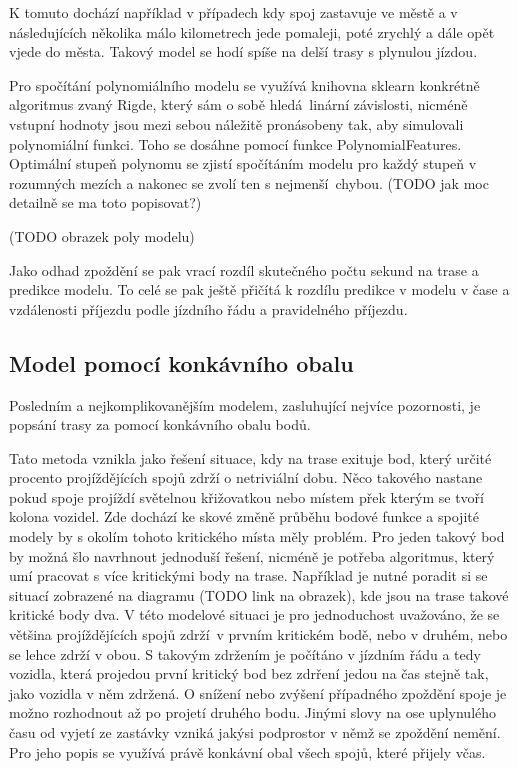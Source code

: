 \bigbreak

K tomuto dochází například v případech kdy spoj zastavuje ve městě a v následujících několika málo kilometrech jede pomaleji, poté zrychlý a dále opět vjede do města. Takový model se hodí spíše na delší trasy s plynulou jízdou.

\bigbreak

Pro spočítání polynomiálního modelu se využívá knihovna sklearn konkrétně algoritmus zvaný Rigde, který sám o sobě hledá linární závislosti, nicméně vstupní hodnoty jsou mezi sebou náležitě pronásobeny tak, aby simulovali polynomiální funkci. Toho se dosáhne pomocí funkce PolynomialFeatures. Optimální stupeň polynomu se zjistí spočítáním modelu pro každý stupeň v rozumných mezích a nakonec se zvolí ten s nejmenší chybou. (TODO jak moc detailně se ma toto popisovat?)

(TODO obrazek poly modelu)

\bigbreak

Jako odhad zpoždění se pak vrací rozdíl skutečného počtu sekund na trase a predikce modelu. To celé se pak ještě přičítá k rozdílu predikce v modelu v čase a vzdálenosti příjezdu podle jízdního řádu a pravidelného příjezdu.


\subsection{Model pomocí konkávního obalu}

Posledním a nejkomplikovanějším modelem, zasluhující nejvíce pozornosti, je popsání trasy za pomocí konkávního obalu bodů.

\bigbreak

Tato metoda vznikla jako řešení situace, kdy na trase exituje bod, který určité procento projíždějících spojů zdrží o netriviální dobu. Něco takového nastane pokud spoje projíždí světelnou křižovatkou nebo místem přek kterým se tvoří kolona vozidel. Zde dochází ke skové změně průběhu bodové funkce a spojité modely by s okolím tohoto kritického místa měly problém. Pro jeden takový bod by možná šlo navrhnout jednoduší řešení, nicméně je potřeba algoritmus, který umí pracovat s více kritickými body na trase. Například je nutné poradit si se situací zobrazené na diagramu (TODO link na obrazek), kde jsou na trase takové kritické body dva. V této modelové situaci je pro jednoduchost uvažováno, že se většina projíždějících spojů zdrží v prvním kritickém bodě, nebo v druhém, nebo se lehce zdrží v obou. S takovým zdržením je počítáno v jízdním řádu a tedy vozidla, která projedou první kritický bod bez zdrření jedou na čas stejně tak, jako vozidla v něm zdržená. O snížení nebo zvýšení případného zpoždění spoje je možno rozhodnout až po projetí druhého bodu. Jinými slovy na ose uplynulého času od vyjetí ze zastávky vzniká jakýsi podprostor v němž se zpoždění nemění. Pro jeho popis se využívá právě konkávní obal všech spojů, které přijely včas.



